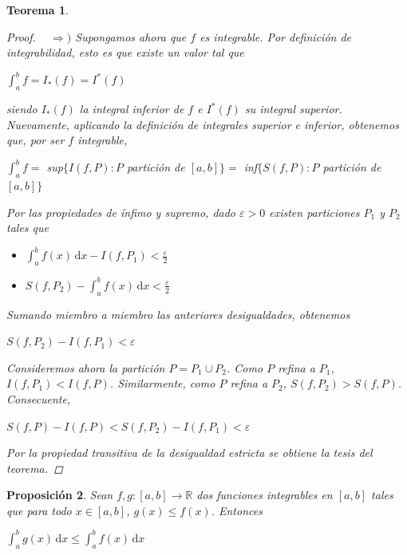 \documentclass[]{article}
\newtheorem{teo}{Teorema}
\newtheorem{prop}[teo]{Proposición}
\def\R{\mathbb{R}}
\def\e{\varepsilon}
\newcommand{\integral}[4]{\int_{#1}^{#2} \! #3 \, \mathrm{d}#4}
\newcommand{\intres}[3]{\int_{#1}^{#2} \! #3}
\begin{document}
\begin{teo}
\begin{proof}
		~\newline
		$\Rightarrow)$ Supongamos ahora que $f$ es integrable. Por definición de integrabilidad, esto es que existe un valor tal que 
		\begin{center}
			$\displaystyle \intres{a}{b}{f} = I_*(f) = I^*(f)$
		\end{center}
		siendo $I_*(f)$ la integral inferior de $f$ e $I^*(f)$ su integral superior. 
		~\newline
		Nuevamente, aplicando la definición de integrales superior e inferior, obtenemos que, por ser $f$ integrable,
		\begin{center}
			$\displaystyle \intres{a}{b}{f}=$ sup$\{I(f,P):P$ partición de $[a,b]\}=$ inf$\{S(f,P):P$ partición de $[a,b]\}$
		\end{center}
		Por las propiedades de ínfimo y supremo, dado $\e>0$ existen particiones $P_1$ y $P_2$ tales que
		\begin{itemize}
			\item
			\begin{center}
				$\displaystyle \integral{a}{b}{f(x)}{x} - I(f,P_1) < \frac{\e}{2}$
			\end{center}
			\item
			\begin{center}
				$\displaystyle S(f,P_2) - \integral{a}{b}{f(x)}{x} < \frac{\e}{2}$
			\end{center}
		\end{itemize}
		Sumando miembro a miembro las anteriores desigualdades, obtenemos 
		\begin{center}
			$S(f,P_2) - I(f,P_1) < \e$
		\end{center}
		Consideremos ahora la partición $P = P_1 \cup P_2$. Como $P$ refina a $P_1$, $I(f,P_1) < I(f,P)$. Similarmente, como $P$ refina a $P_2$, $S(f,P_2) > S(f,P)$. Consecuente,
		\begin{center}
			$S(f,P)-I(f,P) < S(f,P_2) - I(f,P_1) < \e$
		\end{center}
		Por la propiedad transitiva de la desigualdad estricta se obtiene la tesis del teorema.
	\end{proof}
\end{teo}

\begin{prop}
	Sean $f,g:[a,b]\to\R$ dos funciones integrables en $[a,b]$ tales que para todo $x\in[a,b]$, $g(x) \leq f(x)$. Entonces 
	\begin{center}
		$\displaystyle \integral{a}{b}{g(x)}{x} \leq \integral{a}{b}{f(x)}{x}$
	\end{center}
\end{prop}
\end{document}
